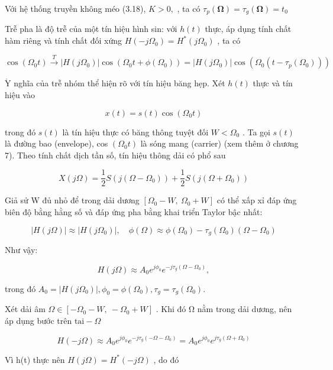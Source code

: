 \documentclass[
  10
]{article}
\begin{document}
Với hệ thống truyền không méo (3.18), \(K > 0 ,\) , ta có
\(\tau _ { p } ( { \boldsymbol { \Omega } } ) = \tau _ { g } ( { \boldsymbol { \Omega } } ) = t _ { 0 }\)

Trễ pha là độ trễ của một tín hiệu hình sin: với \(h ( t )\) thực, áp
dụng tính chất hàm riêng và tính chất đối xứng
\(H ( - j \Omega _ { 0 } ) = H ^ { * } ( j \Omega _ { 0 } )\) , ta có

\[
\cos (\Omega_ {0} t) \stackrel {T} {\longrightarrow} | H (j \Omega_ {0}) | \cos \left(\Omega_ {0} t + \phi (\Omega_ {0})\right) = | H (j \Omega_ {0}) | \cos \left(\Omega_ {0} (t - \tau_ {p} (\Omega_ {0}))\right)
\]

\(\acute { \mathrm { Y } }\) nghĩa của trễ nhóm thể hiện rõ với tín hiệu
băng hẹp. Xét \(h ( t )\) thực và tín hiệu vào

\[
x (t) = s (t) \cos (\Omega_ {0} t)
\]

trong đó \(s ( t )\) là tín hiệu thực có băng thông tuyệt đối
\(W < \Omega _ { 0 }\) . Ta gọi \(s ( t )\) là đường bao (envelope), cos
\(( \Omega _ { 0 } t )\) là sóng mang (carrier) (xem thêm ở chương 7).
Theo tính chất dịch tần số, tín hiệu thông dải có phổ sau

\[
X (j \Omega) = \frac {1}{2} S (j (\Omega - \Omega_ {0})) + \frac {1}{2} S (j (\Omega + \Omega_ {0}))
\]

Giả sử W đủ nhỏ để trong dải dương
\(\left[ \Omega _ { 0 } - W , \ \Omega _ { 0 } + W \right]\) có thể xấp
xỉ đáp ứng biên độ bằng hằng số và đáp ứng pha bằng khai triển Taylor
bậc nhất:

\[
| H (j \Omega) | \approx | H (j \Omega_ {0}) |, \quad \phi (\Omega) \approx \phi (\Omega_ {0}) - \tau_ {g} (\Omega_ {0}) (\Omega - \Omega_ {0})
\]

Như vậy:

\[
H (j \Omega) \approx A _ {0} e ^ {j \phi_ {0}} e ^ {- j \tau_ {g} (\Omega - \Omega_ {0})},
\]

trong đó
\(A _ { 0 } = | H ( j \Omega _ { 0 } ) | , \phi _ { 0 } = \phi ( \Omega _ { 0 } ) , \tau _ { g } = \tau _ { g } ( \Omega _ { 0 } ) .\)

Xét dải âm
\(\Omega \in [ - \Omega _ { 0 } - W , \ - \Omega _ { 0 } + W ]\) . Khi
đó Ω nằm trong dải dương, nên áp dụng bước trên
\(\mathrm { t a i } - \Omega\)

\[
H (- j \Omega) \approx A _ {0} e ^ {j \phi_ {0}} e ^ {- j \tau_ {g} (- \Omega - \Omega_ {0})} = A _ {0} e ^ {j \phi_ {0}} e ^ {j \tau_ {g} (\Omega + \Omega_ {0})}
\]

Vì h(t) thực nên \(H ( j \Omega ) = H ^ { \ast } ( - j \Omega )\) , do
đó
\end{document}
